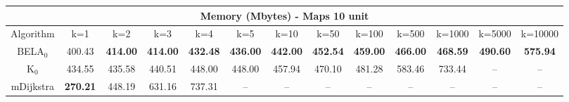 \begin{tabular}{c|cccccccccccc}\toprule
\multicolumn{13}{c}{Memory (Mbytes) - Maps 10 unit}\\ \midrule
Algorithm & k=1 & k=2 & k=3 & k=4 & k=5 & k=10 & k=50 & k=100 & k=500 & k=1000 & k=5000 & k=10000 \\ \midrule
BELA$_0$ & 400.43 & \textbf{414.00} & \textbf{414.00} & \textbf{432.48} & \textbf{436.00} & \textbf{442.00} & \textbf{452.54} & \textbf{459.00} & \textbf{466.00} & \textbf{468.59} & \textbf{490.60} & \textbf{575.94} \\
K$_0$ & 434.55 & 435.58 & 440.51 & 448.00 & 448.00 & 457.94 & 470.10 & 481.28 & 583.46 & 733.44 & -- & -- \\
mDijkstra & \textbf{270.21} & 448.19 & 631.16 & 737.31 & -- & -- & -- & -- & -- & -- & -- & -- \\ \bottomrule 
\end{tabular}
